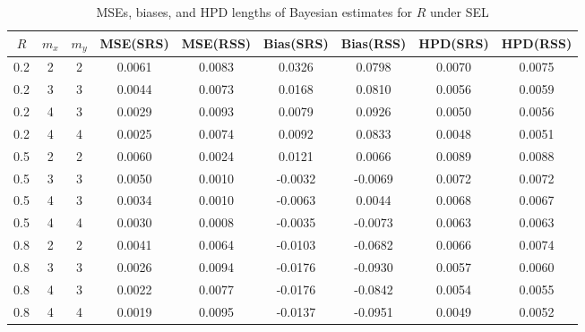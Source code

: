 \documentclass[twoside]{article}
\begin{document}
\begin{table}[h]
\centering
\caption{MSEs, biases, and HPD lengths of Bayesian estimates for \(R\) under SEL}
\label{tab1}
\begin{tabular}{ccccccccc}
\hline
\(R\) & \(m_x\) & \(m_y\) & MSE(SRS) & MSE(RSS) & Bias(SRS) & Bias(RSS) & HPD(SRS)& HPD(RSS) \\
\hline
0.2 & 2 & 2 & 0.0061 & 0.0083 & 0.0326 & 0.0798 & 0.0070 & 0.0075 \\
0.2 & 3 & 3 & 0.0044 & 0.0073 & 0.0168 & 0.0810 & 0.0056 & 0.0059 \\
0.2 & 4 & 3 & 0.0029 & 0.0093 & 0.0079 & 0.0926 & 0.0050 & 0.0056 \\
0.2 & 4 & 4 & 0.0025 & 0.0074 & 0.0092 & 0.0833 & 0.0048 & 0.0051 \\
\hline
0.5 & 2 & 2 & 0.0060 & 0.0024 & 0.0121 & 0.0066 & 0.0089 & 0.0088 \\
0.5 & 3 & 3 & 0.0050 & 0.0010 & -0.0032 & -0.0069 & 0.0072 & 0.0072 \\
0.5 & 4 & 3 & 0.0034 & 0.0010 & -0.0063 & 0.0044 & 0.0068 & 0.0067 \\
0.5 & 4 & 4 & 0.0030 & 0.0008 & -0.0035 & -0.0073 & 0.0063 & 0.0063 \\
\hline
0.8 & 2 & 2 & 0.0041 & 0.0064 & -0.0103 & -0.0682 & 0.0066 & 0.0074 \\
0.8 & 3 & 3 & 0.0026 & 0.0094 & -0.0176 & -0.0930 & 0.0057 & 0.0060 \\
0.8 & 4 & 3 & 0.0022 & 0.0077 & -0.0176 & -0.0842 & 0.0054 & 0.0055 \\
0.8 & 4 & 4 & 0.0019 & 0.0095 & -0.0137 & -0.0951 & 0.0049 & 0.0052 \\
\hline
\end{tabular}
\end{table}

\end{document}
